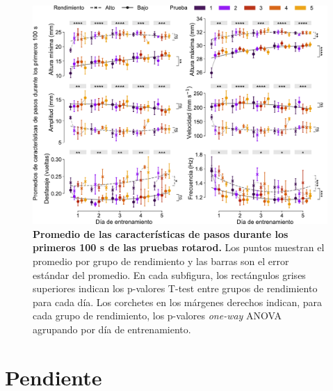 \begin{appendix}
    \begin{figure}[htbp]
        \centering
        \includegraphics[width=0.99\linewidth]{figuras/capitulo3/metricas_promedio.pdf}
        \caption{\textbf{Promedio de las características de pasos durante los primeros 100 s de las pruebas rotarod.} Los puntos muestran el promedio por grupo de rendimiento y las barras son el error estándar del promedio.
            En cada subfigura, los rectángulos grises superiores indican los p-valores T-test entre grupos de rendimiento para cada día.
            Los corchetes en los márgenes derechos indican, para cada grupo de rendimiento, los p-valores \textit{one-way} ANOVA agrupando por día de entrenamiento.}
        \label{fig:capitulo3_metricas_promedio}
    \end{figure}

    \clearpage

    \section{Pendiente}\label{sec:apendice_pendiente}


\end{appendix}
